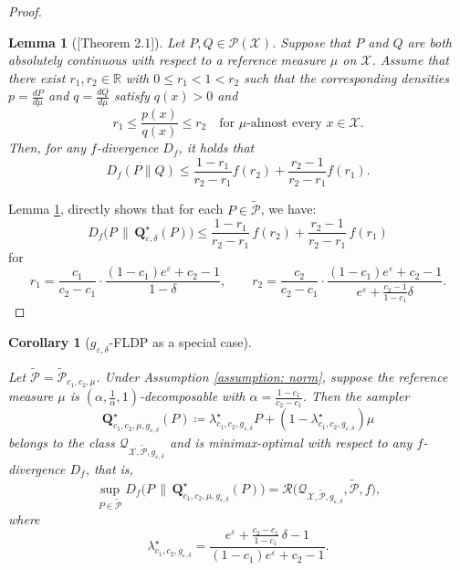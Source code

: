 \documentclass[accepted]{article}
\theoremstyle{plain} %
\newtheorem{lemma}[theorem]{Lemma}
\newtheorem{corollary}[theorem]{Corollary}
\theoremstyle{definition}
\theoremstyle{remark}
\newcommand{\eps}{\varepsilon}
\newcommand{\bQ}{\mathbf{Q}}
\begin{document}
\begin{proof}
\begin{lemma}[{[Theorem 2.1]{\citep{rukhin1997information}}}]\label{lem: bounded f-div}
Let \( P, Q \in \mathcal{P}(\mathcal{X}) \). Suppose that \( P \) and \( Q \) are both absolutely continuous with respect to a reference measure \( \mu \) on \( \mathcal{X} \). Assume that there exist \( r_1, r_2 \in \mathbb{R} \) with \( 0 \leq r_1 < 1 < r_2 \) such that the corresponding densities \( p = \frac{dP}{d\mu} \) and \( q = \frac{dQ}{d\mu} \) satisfy \( q(x) > 0 \) and
\[
r_1 \leq \frac{p(x)}{q(x)} \leq r_2
\quad \text{for } \mu\text{-almost every } x \in \mathcal{X}.
\]
Then, for any \( f \)-divergence \( D_f \), it holds that
\[
D_f(P\|Q) \leq \frac{1 - r_1}{r_2 - r_1} f(r_2) + \frac{r_2 - 1}{r_2 - r_1} f(r_1).
\]
\end{lemma}

Lemma \ref{lem: bounded f-div}, directly shows that for each $P \in  \tilde{\mathcal{P}}$, we have:
        \[D_f\big(P \, \| \, \bQ^\star_{\varepsilon, \delta}(P)\big) \le \frac{1 - r_1}{r_2 - r_1} \, f(r_2) + \frac{r_2 - 1}{r_2 - r_1} \, f(r_1)\]
for
\[
    r_1 = \frac{c_1}{c_2 - c_1} \cdot \frac{(1 - c_1)e^{\varepsilon} + c_2 - 1}{1 - \delta},
    \qquad
    r_2 = \frac{c_2}{c_2 - c_1} \cdot \frac{(1 - c_1)e^{\varepsilon} + c_2 - 1}{e^{\varepsilon} + \frac{c_2 - 1}{1 - c_1} \delta}.
    \]
\end{proof}

\begin{corollary}[$g_{\eps,\delta}$-FLDP as a special case]\label{cor: special case of f-LDP approximate}

Let $\tilde{\mathcal{P}} = \tilde{\mathcal{P}}_{c_1, c_2, \mu}$. Under Assumption \ref{assumption: norm}, suppose the reference measure $\mu$ is $(\alpha,\frac{1}{\alpha},1)$-decomposable with $\alpha = \frac{1 - c_1}{c_2 - c_1}$. Then the sampler
\begin{equation}
    \bQ^\star_{c_1,c_2,\mu,g_{\varepsilon,\delta}}(P) \coloneqq \lambda^\star_{c_1,c_2,g_{\varepsilon,\delta}} P + (1 - \lambda^\star_{c_1,c_2,g_{\varepsilon,\delta}})\mu
\end{equation}
belongs to the class $\mathcal{Q}_{\mathcal{X}, \tilde{\mathcal{P}}, g_{\varepsilon,\delta}}$ and is minimax-optimal with respect to any $f$-divergence $D_f$, that is,
\begin{equation}
    \sup_{P \in \tilde{\mathcal{P}}} D_f\big(P \, \| \, \bQ^\star_{c_1,c_2,\mu,g_{\varepsilon,\delta}}(P)\big)
    = \mathcal{R}\big(\mathcal{Q}_{\mathcal{X}, \tilde{\mathcal{P}}, g_{\varepsilon,\delta}}, \tilde{\mathcal{P}}, f\big),
\end{equation}
where 
\[
\lambda^\star_{c_1,c_2,g_{\varepsilon,\delta}} = \frac{e^{\varepsilon} + \frac{c_2 - c_1}{1 - c_1} \, \delta - 1}{(1 - c_1) e^{\varepsilon} + c_2 - 1}.
\]

\end{corollary}
\end{document}
